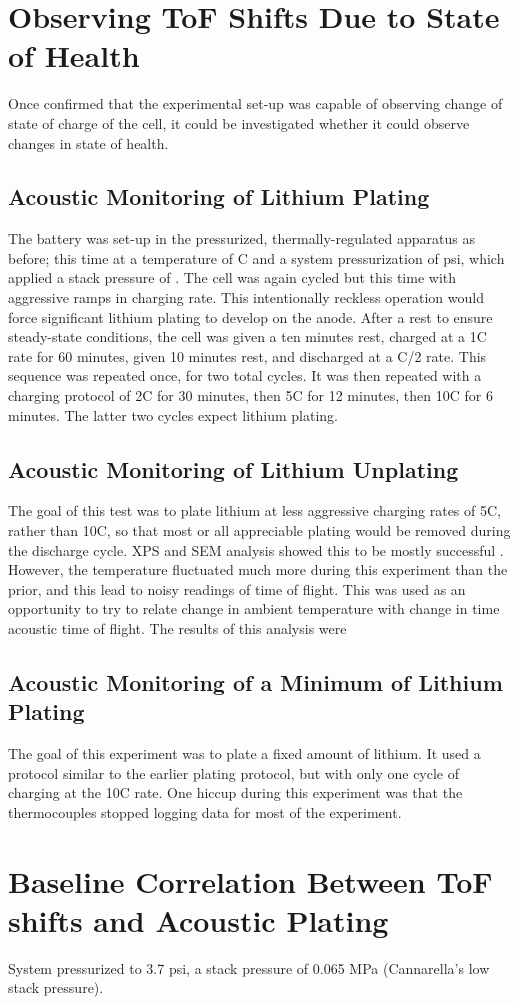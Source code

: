 \section{Observing ToF Shifts Due to State of Health} 
Once confirmed that the experimental set-up was capable of observing change of state of charge of the cell, it could be investigated whether it could observe changes in state of health.

\subsection{Acoustic Monitoring of Lithium Plating}
The battery was set-up in the pressurized, thermally-regulated apparatus as before; this time at a temperature of  C and a system pressurization of  psi, which applied a stack pressure of . 
The cell was again cycled but this time with aggressive ramps in charging rate. 
This intentionally reckless operation would force significant lithium plating to develop on the anode. 
After a rest to ensure steady-state conditions, the cell was given a ten minutes rest, charged at a 1C rate for 60 minutes, given 10 minutes rest, and discharged at a C/2 rate. 
This sequence was repeated once, for two total cycles. 
It was then repeated with a charging protocol of 2C for 30 minutes, then 5C for 12 minutes, then 10C for 6 minutes. 
The latter two cycles expect lithium plating.


\subsection{Acoustic Monitoring of Lithium Unplating}
The goal of this test was to plate lithium at less aggressive charging rates of 5C, rather than 10C, so that most or all appreciable plating would be removed during the discharge cycle. XPS and SEM analysis showed this to be mostly successful . However, the temperature fluctuated much more during this experiment than the prior, and this lead to noisy readings of time of flight. This was used as an opportunity to try to relate change in ambient temperature with change in time acoustic time of flight. The results of this analysis were 


\subsection{Acoustic Monitoring of a Minimum of Lithium Plating}
The goal of this experiment was to plate a fixed amount of lithium. It used a protocol similar to the earlier plating protocol, but with only one cycle of charging at the 10C rate. One hiccup during this experiment was that the thermocouples stopped logging data for most of the experiment. 


\section{Baseline Correlation Between ToF shifts and Acoustic Plating}
System pressurized to 3.7 psi, a stack pressure of 0.065 MPa (Cannarella's low stack pressure).